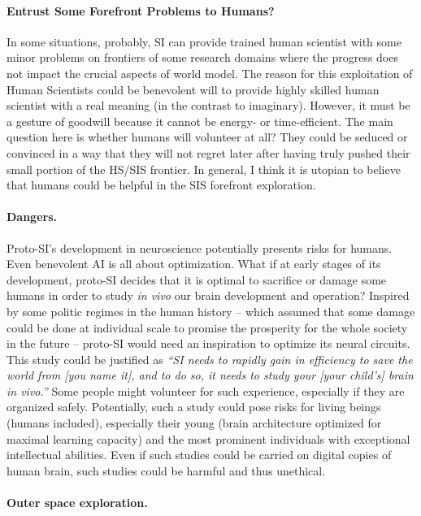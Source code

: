 \documentclass[a4paper,11pt]{article}
\begin{document}
\paragraph{Entrust Some Forefront Problems to Humans?}

In some situations, probably, SI can provide trained human scientist with some minor problems on frontiers of some research domains where the progress does not impact the crucial aspects of world model. The reason for this exploitation of Human Scientists could be benevolent will to provide highly skilled human scientist with a real meaning (in the contrast to imaginary). However, it must be a gesture of goodwill because it cannot be  energy- or time-efficient. The main question here is whether humans will volunteer at all? They could be seduced or convinced in a way that they will not regret later after having truly pushed their small portion of the HS/SIS frontier. In general, I think it is utopian to believe that humans could be helpful in the SIS forefront exploration. 

\paragraph{Dangers.} 

Proto-SI's development in neuroscience potentially presents risks for humans. Even benevolent AI is all about optimization. What if at early stages of its development, proto-SI decides that it is optimal to sacrifice or damage some humans in order to study \emph{in vivo} our brain development and operation? Inspired by some politic regimes in the human history -- which assumed that some damage could be done at individual scale to promise the prosperity for the whole society in the future -- proto-SI would need an inspiration to optimize its neural circuits. This study could be justified as \textit{``SI needs to rapidly gain in efficiency to save the world from [you name it], and to do so, it needs to study your [your child's] brain in vivo.''} 
Some people might volunteer for such experience, especially if they are organized safely.
Potentially, such a study could pose risks for living beings (humans included), especially their young (brain architecture optimized for maximal learning capacity) and the most prominent individuals with exceptional intellectual abilities. Even if such studies could be carried on digital copies of human brain, such studies could be harmful and thus unethical.

\paragraph{Outer space exploration.}
\end{document}
